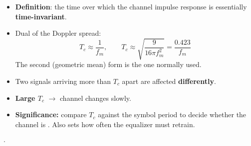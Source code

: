 \vspace{2pt}
\begin{itemize}
  \item \textbf{Definition}: the time over which the channel impulse response is essentially
        \textbf{time-invariant}.
  \item Dual of the Doppler spread:
        \[ T_c \approx \frac{1}{f_m}, \qquad
           T_c \approx \sqrt{\frac{9}{16\pi f_m^2}} = \frac{0.423}{f_m} \]
        The second (geometric mean) form is the one normally used.
  \item Two signals arriving more than $T_c$ apart are affected \textbf{differently}.
  \item \textbf{Large $T_c$} $\rightarrow$ channel changes slowly.
  \item \textbf{Significance:} compare $T_c$ against the symbol period to decide whether the
        channel is . Also sets how often the equalizer must retrain.
\end{itemize}

{\color{sub}\footnotesize {}  \gap$\cdot$\gap
{}}

